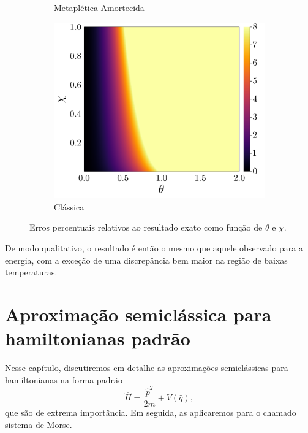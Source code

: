 \documentclass[
	12pt,
	oneside,			%
	a4paper,			%
	english,			%
	brazil				%
	]{abntex2}
\theoremstyle{definition}
\begin{document}
\begin{figure}[H]
\begin{subfigure}[b]{0.32\textwidth}
         \caption{Metaplética Amortecida}
         \label{erro relativo calor kerr dm}
     \end{subfigure}
     \hfill
     \begin{subfigure}[b]{0.32\textwidth}
         \centering
         \includegraphics[width=\textwidth]{Imagens/erro_relativo_calor_kerr_cl.png}
         \caption{Clássica}
         \label{erro relativo calor kerr cl}
     \end{subfigure}
        \caption{Erros percentuais relativos ao resultado exato como função de $\theta$ e $\chi$.}
        \label{erros relativos calor kerr}
\end{figure}

De modo qualitativo, o resultado é então o mesmo que aquele observado para a energia, com a exceção de uma discrepância bem maior na região de baixas temperaturas.


\chapter{Aproximação semiclássica para hamiltonianas padrão}
\label{Aproximação semiclássica para hamiltonianas padrão}

Nesse capítulo, discutiremos em detalhe as aproximações semiclássicas para hamiltonianas na forma padrão
\begin{equation}
\label{hamiltoniana padrão}
    \hat{H} = \frac{\hat{p}^2}{2m} + V\left( \hat{q} \right),
\end{equation}
que são de extrema importância. Em seguida, as aplicaremos para o chamado sistema de Morse.
\end{document}
